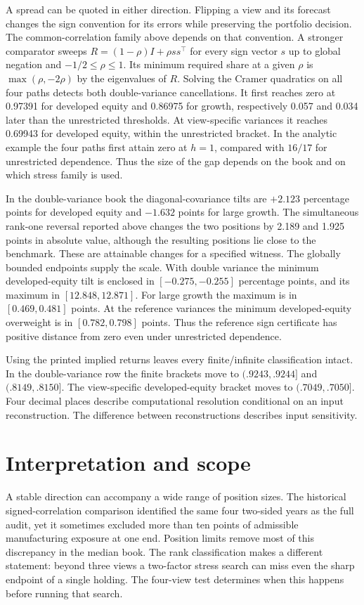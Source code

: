 \documentclass[11pt]{article}
\begin{document}
A spread can be quoted in either direction. Flipping a view and its forecast changes the sign convention for its errors while preserving the portfolio decision. The common-correlation family above depends on that convention. A stronger comparator sweeps $R=(1-\rho)I+\rho ss^\top$ for every sign vector $s$ up to global negation and $-1/2\le\rho\le1$. Its minimum required share at a given $\rho$ is $\max(\rho,-2\rho)$ by the eigenvalues of $R$. Solving the Cramer quadratics on all four paths detects both double-variance cancellations. It first reaches zero at 0.97391 for developed equity and 0.86975 for growth, respectively 0.057 and 0.034 later than the unrestricted thresholds. At view-specific variances it reaches 0.69943 for developed equity, within the unrestricted bracket. In the analytic example the four paths first attain zero at $h=1$, compared with $16/17$ for unrestricted dependence. Thus the size of the gap depends on the book and on which stress family is used.

In the double-variance book the diagonal-covariance tilts are $+2.123$ percentage points for developed equity and $-1.632$ points for large growth. The simultaneous rank-one reversal reported above changes the two positions by 2.189 and 1.925 points in absolute value, although the resulting positions lie close to the benchmark. These are attainable changes for a specified witness. The globally bounded endpoints supply the scale. With double variance the minimum developed-equity tilt is enclosed in $[-0.275,-0.255]$ percentage points, and its maximum in $[12.848,12.871]$. For large growth the maximum is in $[0.469,0.481]$ points. At the reference variances the minimum developed-equity overweight is in $[0.782,0.798]$ points. Thus the reference sign certificate has positive distance from zero even under unrestricted dependence.

Using the printed implied returns leaves every finite/infinite classification intact. In the double-variance row the finite brackets move to $(.9243,.9244]$ and $(.8149,.8150]$. The view-specific developed-equity bracket moves to $(.7049,.7050]$. Four decimal places describe computational resolution conditional on an input reconstruction. The difference between reconstructions describes input sensitivity.



\section{Interpretation and scope}
A stable direction can accompany a wide range of position sizes. The historical signed-correlation comparison identified the same four two-sided years as the full audit, yet it sometimes excluded more than ten points of admissible manufacturing exposure at one end. Position limits remove most of this discrepancy in the median book. The rank classification makes a different statement: beyond three views a two-factor stress search can miss even the sharp endpoint of a single holding. The four-view test determines when this happens before running that search.
\end{document}
